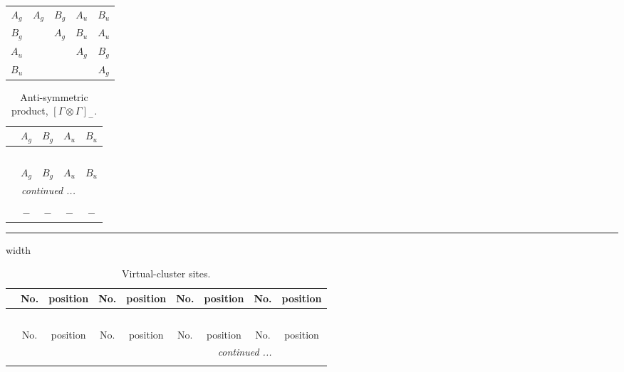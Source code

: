\documentclass[fleqn,10pt,landscape]{article}
\begin{document}
\begin{itemize}
\begin{center}
\begin{longtable}{c|cccc}
$ A_{g} $ & $ A_{g} $ & $ B_{g} $ & $ A_{u} $ & $ B_{u} $ \\
$ B_{g} $ & $  $ & $ A_{g} $ & $ B_{u} $ & $ A_{u} $ \\
$ A_{u} $ & $  $ & $  $ & $ A_{g} $ & $ B_{g} $ \\
$ B_{u} $ & $  $ & $  $ & $  $ & $ A_{g} $ \\
\end{longtable}
\end{center}
\begin{center}
\renewcommand{\arraystretch}{1.0}
\begin{longtable}{ccccc}
\caption{Anti-symmetric product, $[\Gamma\otimes\Gamma]_-$.}
 \\
 \hline \hline
 & $ A_{g} $ & $ B_{g} $ & $ A_{u} $ & $ B_{u} $ \\ \hline \endfirsthead

\multicolumn{4}{l}{\tablename\ \thetable{}} \\
 \hline \hline
 & $ A_{g} $ & $ B_{g} $ & $ A_{u} $ & $ B_{u} $ \\ \hline \endhead

 \hline \hline
\multicolumn{4}{r}{\footnotesize\it continued ...} \\ \endfoot

 \hline \hline
\multicolumn{4}{r}{} \\ \endlastfoot

$  $ & $ - $ & $ - $ & $ - $ & $ - $ \\
\end{longtable}
\end{center}

 \hfil \hrule height 1mm width \textwidth \hfil

{
\scriptsize
\begin{center}
\renewcommand{\arraystretch}{1.7}
\begin{longtable}{ccccccccc}
\caption{Virtual-cluster sites.}
 \\
 \hline \hline
 & No. & position & No. & position & No. & position & No. & position \\ \hline \endfirsthead

\multicolumn{8}{l}{\tablename\ \thetable{}} \\
 \hline \hline
 & No. & position & No. & position & No. & position & No. & position \\ \hline \endhead

 \hline \hline
\multicolumn{8}{r}{\footnotesize\it continued ...} \\ \endfoot


\end{longtable}
\end{center}}
\end{itemize}
\end{document}
